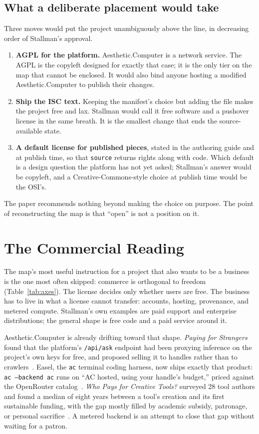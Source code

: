 \documentclass[10pt,letterpaper,twocolumn]{article}
\newcommand{\acdot}{{\color{acpink}.}}
\newcommand{\ac}{Aesthetic{\acdot}Computer}
\newcommand{\code}[1]{\texttt{#1}}
\newcommand{\term}[1]{``#1''}
\begin{document}
\subsection{What a deliberate placement would take}

Three moves would put the project unambiguously above the line, in decreasing order of Stallman's approval.

\begin{enumerate}
  \item \textbf{AGPL for the platform.} \ac{} is a network service. The AGPL is the copyleft designed for exactly that case; it is the only tier on the map that cannot be enclosed. It would also bind anyone hosting a modified \ac{} to publish their changes.
  \item \textbf{Ship the ISC text.} Keeping the manifest's choice but adding the file makes the project free and lax. Stallman would call it free software and a pushover license in the same breath. It is the smallest change that ends the source-available state.
  \item \textbf{A default license for published pieces}, stated in the authoring guide and at publish time, so that \code{source} returns rights along with code. Which default is a design question the platform has not yet asked; Stallman's answer would be copyleft, and a Creative-Commons-style choice at publish time would be the OSI's.
\end{enumerate}

The paper recommends nothing beyond making the choice on purpose. The point of reconstructing the map is that \term{open} is not a position on it.

\section{The Commercial Reading}

The map's most useful instruction for a project that also wants to be a business is the one most often skipped: commerce is orthogonal to freedom (Table~\ref{tab:axes}). The license decides only whether users are free. The business has to live in what a license cannot transfer: accounts, hosting, provenance, and metered compute. Stallman's own examples are paid support and enterprise distributions; the general shape is free code and a paid service around it.

\ac{} is already drifting toward that shape. \emph{Paying for Strangers} found that the platform's \code{/api/ask} endpoint had been proxying inference on the project's own keys for free, and proposed selling it to handles rather than to crawlers~\citep{scudder2026turnstile}. Easel, the \code{ac} terminal coding harness, now ships exactly that product: \code{ac --backend ac} runs on \term{AC hosted, using your handle's budget,} priced against the OpenRouter catalog~\citep{easel2026}. \emph{Who Pays for Creative Tools?} surveyed 28 tool authors and found a median of eight years between a tool's creation and its first sustainable funding, with the gap mostly filled by academic subsidy, patronage, or personal sacrifice~\citep{scudder2026sustainability}. A metered backend is an attempt to close that gap without waiting for a patron.
\end{document}

